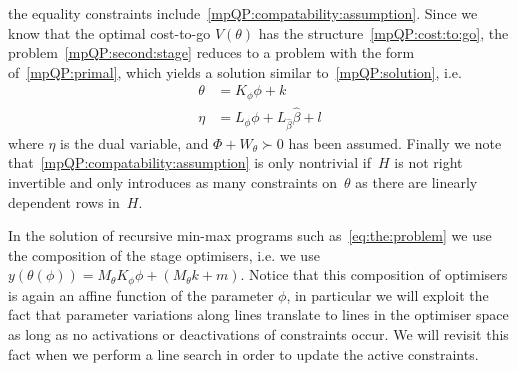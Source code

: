 \documentclass{ifacconf}
\begin{document}
the equality constraints include~\eqref{mpQP:compatability:assumption}. Since we know
that the optimal cost-to-go $V(\theta)$ has the structure~\eqref{mpQP:cost:to:go},
the problem~\eqref{mpQP:second:stage} reduces to a problem with the form of~\eqref{mpQP:primal},
which yields a solution similar to~\eqref{mpQP:solution}, i.e.
\begin{equation}
\begin{split}
	\theta &= K_\phi \phi + k\\
	\eta &= L_\phi \phi + L_{\hat\beta} \hat\beta + l
\end{split}
\end{equation}
where $\eta$ is the dual variable, and $\Phi+W_\theta\succ 0$ has been assumed. Finally we note 
that~\eqref{mpQP:compatability:assumption} is only nontrivial if~$H$ is not right invertible and only 
introduces as many constraints on~$\theta$ as there are linearly
dependent rows in~$H$.

In the solution of recursive min-max programs such as~\eqref{eq:the:problem} we use the composition of
the stage optimisers, i.e. we use $y(\theta(\phi)) = M_\theta K_\phi \phi + (M_\theta k + m)$.
Notice that this composition of optimisers is again an affine function of the parameter $\phi$, in particular
we will exploit the fact that parameter variations along lines translate to lines in the optimiser
space as long as no activations or deactivations of constraints occur. We will revisit this fact
when we perform a line search in order to update the active constraints.
\end{document}
